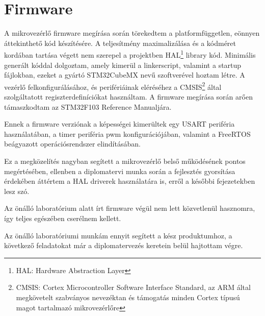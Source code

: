 \chapter{Firmware}





A mikrovezérlő firmware megírása során törekedtem a platformfüggetlen, eönnyen
áttekinthető kód készítésére. A teljesítmény maximalizálása és a kódméret
kordában tartása végett nem szerepel a projektben HAL\footnote{HAL: Hardware
Abstraction Layer} library kód. Minimális generált kóddal dolgoztam, amely
kimerül a linkerscript, valamint a startup fájlokban, ezeket a gyártó STM32CubeMX
nevű szoftverével hoztam létre. A vezérlő felkonfigurálásához, és perifériáinak
eléréséhez a CMSIS\footnote{CMSIS: Cortex Microcontroller Software Interface
Standard, az ARM által megkövetelt szabványos nevezéktan és támogatás minden
Cortex típusú magot tartalmazó mikrovezérlőre} által szolgáltatott
regiszterdefiníciókat használtam. A firmware megírása során arően támaszkodtam az
STM32F103 Reference Manualjára.

Ennek a firmware verziónak a képességei kimerültek egy USART periféria
használatában, a timer periféria pwm konfigurációjában, valamint a FreeRTOS
beágyazott operációsrendszer elindításában.

Ez a megközelítés nagyban segített a mikrovezérlő belső működésének pontos
megértésében, ellenben a diplomatervi munka során a fejlesztés gyorsítása
érdekében áttértem a HAL driverek használatára is, erről a későbbi fejezetekben
lesz szó.

Az önálló laboratórium alatt írt firmware végül nem lett közvetlenül hasznomra,
így teljes egészében cserélnem kellett.

Az önálló laboratóriumi munkám ennyit segített a kész produktumhoz, a következő
feladatokat már a diplomatervezés keretein belül hajtottam végre.
